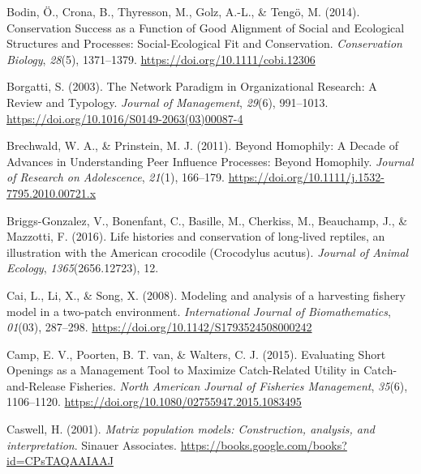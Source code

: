 \documentclass[
  12pt,
]{article}
\newlength{\cslhangindent}
\newlength{\cslentryspacingunit} %
\newenvironment{CSLReferences}[2] %
 {%
  \setlength{\parindent}{0pt}
  \ifodd #1
  \let\oldpar\par
  \def\par{\hangindent=\cslhangindent\oldpar}
  \fi
  \setlength{\parskip}{#2\cslentryspacingunit}
 }%
 {}
\begin{document}
\begin{CSLReferences}{1}{2}
\leavevmode{}%
Bodin, Ö., Crona, B., Thyresson, M., Golz, A.-L., \& Tengö, M. (2014). Conservation {Success} as a {Function} of {Good} {Alignment} of {Social} and {Ecological} {Structures} and {Processes}: {Social}-{Ecological} {Fit} and {Conservation}. \emph{Conservation Biology}, \emph{28}(5), 1371--1379. \url{https://doi.org/10.1111/cobi.12306}

\leavevmode{}%
Borgatti, S. (2003). The {Network} {Paradigm} in {Organizational} {Research}: {A} {Review} and {Typology}. \emph{Journal of Management}, \emph{29}(6), 991--1013. \url{https://doi.org/10.1016/S0149-2063(03)00087-4}

\leavevmode{}%
Brechwald, W. A., \& Prinstein, M. J. (2011). Beyond {Homophily}: {A} {Decade} of {Advances} in {Understanding} {Peer} {Influence} {Processes}: {Beyond} {Homophily}. \emph{Journal of Research on Adolescence}, \emph{21}(1), 166--179. \url{https://doi.org/10.1111/j.1532-7795.2010.00721.x}

\leavevmode{}%
Briggs-Gonzalez, V., Bonenfant, C., Basille, M., Cherkiss, M., Beauchamp, J., \& Mazzotti, F. (2016). Life histories and conservation of long‐lived reptiles, an illustration with the {American} crocodile ({Crocodylus} acutus). \emph{Journal of Animal Ecology}, \emph{1365}(2656.12723), 12.

\leavevmode{}%
Cai, L., Li, X., \& Song, X. (2008). Modeling and analysis of a harvesting fishery model in a two-patch environment. \emph{International Journal of Biomathematics}, \emph{01}(03), 287--298. \url{https://doi.org/10.1142/S1793524508000242}

\leavevmode{}%
Camp, E. V., Poorten, B. T. van, \& Walters, C. J. (2015). Evaluating {Short} {Openings} as a {Management} {Tool} to {Maximize} {Catch}-{Related} {Utility} in {Catch}-and-{Release} {Fisheries}. \emph{North American Journal of Fisheries Management}, \emph{35}(6), 1106--1120. \url{https://doi.org/10.1080/02755947.2015.1083495}

\leavevmode{}%
Caswell, H. (2001). \emph{Matrix population models: {Construction}, analysis, and interpretation}. Sinauer Associates. \url{https://books.google.com/books?id=CPsTAQAAIAAJ}


\end{CSLReferences}
\end{document}
